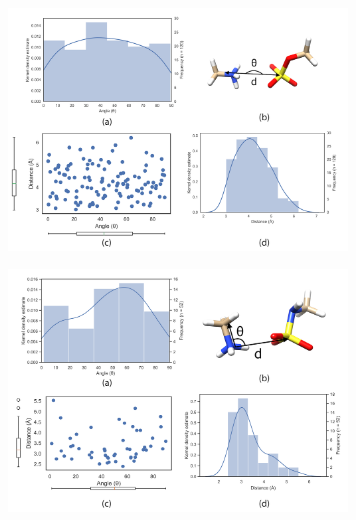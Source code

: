 \documentclass[a4paper, 12pt, openany]{book}
\begin{document}
\begin{figure}
    \centering
    \includegraphics[width=9cm]{Figures/Datamining/lys_sulfate.png}
    \caption{
    }
    \label{fig:my_label}
\end{figure}

\begin{figure}
    \centering
    \includegraphics[width=9cm]{Figures/Datamining/lys_Nsulfate.png}
    \caption{
    }
    \label{fig:my_label}
\end{figure}
\end{document}
